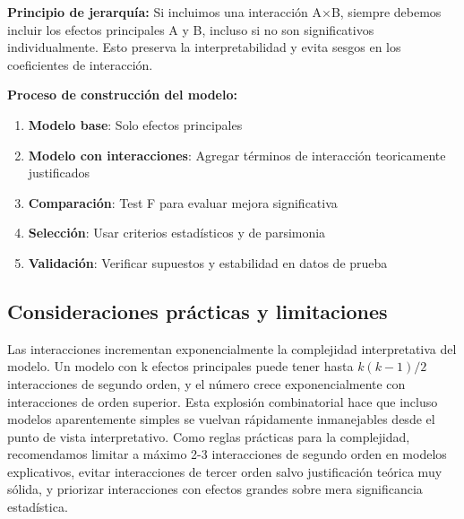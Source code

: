 \documentclass[
  letterpaper,
  DIV=11,
  numbers=noendperiod]{scrreprt}
\providecommand{\tightlist}{%
  \setlength{\itemsep}{0pt}\setlength{\parskip}{0pt}}
\begin{document}
\begin{tcolorbox}[enhanced jigsaw, leftrule=.75mm, breakable, colbacktitle=quarto-callout-note-color!10!white, bottomrule=.15mm, colframe=quarto-callout-note-color-frame, toprule=.15mm, colback=white, coltitle=black, bottomtitle=1mm, left=2mm, title=\textcolor{quarto-callout-note-color}{\faInfo}\hspace{0.5em}{Estrategia de modelado jerárquico}, opacityback=0, arc=.35mm, opacitybacktitle=0.6, toptitle=1mm, titlerule=0mm, rightrule=.15mm]

\textbf{Principio de jerarquía:} Si incluimos una interacción A×B,
siempre debemos incluir los efectos principales A y B, incluso si no son
significativos individualmente. Esto preserva la interpretabilidad y
evita sesgos en los coeficientes de interacción.

\textbf{Proceso de construcción del modelo:}

\begin{enumerate}
\def\labelenumi{\arabic{enumi}.}
\tightlist
\item
  \textbf{Modelo base}: Solo efectos principales
\item
  \textbf{Modelo con interacciones}: Agregar términos de interacción
  teoricamente justificados
\item
  \textbf{Comparación}: Test F para evaluar mejora significativa
\item
  \textbf{Selección}: Usar criterios estadísticos y de parsimonia
\item
  \textbf{Validación}: Verificar supuestos y estabilidad en datos de
  prueba
\end{enumerate}

\end{tcolorbox}

\subsection{Consideraciones prácticas y
limitaciones}\label{consideraciones-pruxe1cticas-y-limitaciones}

Las interacciones incrementan exponencialmente la complejidad
interpretativa del modelo. Un modelo con k efectos principales puede
tener hasta \(k(k-1)/2\) interacciones de segundo orden, y el número
crece exponencialmente con interacciones de orden superior. Esta
explosión combinatorial hace que incluso modelos aparentemente simples
se vuelvan rápidamente inmanejables desde el punto de vista
interpretativo. Como reglas prácticas para la complejidad, recomendamos
limitar a máximo 2-3 interacciones de segundo orden en modelos
explicativos, evitar interacciones de tercer orden salvo justificación
teórica muy sólida, y priorizar interacciones con efectos grandes sobre
mera significancia estadística.
\end{document}
